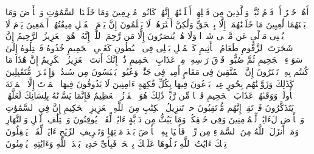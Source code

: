\startbuffer[\q:44:37]
أَهُمۡ خَیۡرٌ أَمۡ قَوۡمُ تُبَّعࣲ وَٱلَّذِینَ مِن قَبۡلِهِمۡ أَهۡلَكۡنَٰهُمۡۚ إِنَّهُمۡ كَانُوا۟ مُجۡرِمِینَ%
\stopbuffer
\startbuffer[\q:44:38]
وَمَا خَلَقۡنَا ٱلسَّمَٰوَٰتِ وَٱلۡأَرۡضَ وَمَا بَیۡنَهُمَا لَٰعِبِینَ%
\stopbuffer
\startbuffer[\q:44:39]
مَا خَلَقۡنَٰهُمَاۤ إِلَّا بِٱلۡحَقِّ وَلَٰكِنَّ أَكۡثَرَهُمۡ لَا یَعۡلَمُونَ%
\stopbuffer
\startbuffer[\q:44:40]
إِنَّ یَوۡمَ ٱلۡفَصۡلِ مِیقَٰتُهُمۡ أَجۡمَعِینَ%
\stopbuffer
\startbuffer[\q:44:41]
یَوۡمَ لَا یُغۡنِی مَوۡلًى عَن مَّوۡلࣰى شَیۡءࣰا وَلَا هُمۡ یُنصَرُونَ%
\stopbuffer
\startbuffer[\q:44:42]
إِلَّا مَن رَّحِمَ ٱللَّهُۚ إِنَّهُۥ هُوَ ٱلۡعَزِیزُ ٱلرَّحِیمُ%
\stopbuffer
\startbuffer[\q:44:43]
إِنَّ شَجَرَتَ ٱلزَّقُّومِ%
\stopbuffer
\startbuffer[\q:44:44]
طَعَامُ ٱلۡأَثِیمِ%
\stopbuffer
\startbuffer[\q:44:45]
كَٱلۡمُهۡلِ یَغۡلِی فِی ٱلۡبُطُونِ%
\stopbuffer
\startbuffer[\q:44:46]
كَغَلۡیِ ٱلۡحَمِیمِ%
\stopbuffer
\startbuffer[\q:44:47]
خُذُوهُ فَٱعۡتِلُوهُ إِلَىٰ سَوَاۤءِ ٱلۡجَحِیمِ%
\stopbuffer
\startbuffer[\q:44:48]
ثُمَّ صُبُّوا۟ فَوۡقَ رَأۡسِهِۦ مِنۡ عَذَابِ ٱلۡحَمِیمِ%
\stopbuffer
\startbuffer[\q:44:49]
ذُقۡ إِنَّكَ أَنتَ ٱلۡعَزِیزُ ٱلۡكَرِیمُ%
\stopbuffer
\startbuffer[\q:44:50]
إِنَّ هَٰذَا مَا كُنتُم بِهِۦ تَمۡتَرُونَ%
\stopbuffer
\startbuffer[\q:44:51]
إِنَّ ٱلۡمُتَّقِینَ فِی مَقَامٍ أَمِینࣲ%
\stopbuffer
\startbuffer[\q:44:52]
فِی جَنَّٰتࣲ وَعُیُونࣲ%
\stopbuffer
\startbuffer[\q:44:53]
یَلۡبَسُونَ مِن سُندُسࣲ وَإِسۡتَبۡرَقࣲ مُّتَقَٰبِلِینَ%
\stopbuffer
\startbuffer[\q:44:54]
كَذَٰلِكَ وَزَوَّجۡنَٰهُم بِحُورٍ عِینࣲ%
\stopbuffer
\startbuffer[\q:44:55]
یَدۡعُونَ فِیهَا بِكُلِّ فَٰكِهَةٍ ءَامِنِینَ%
\stopbuffer
\startbuffer[\q:44:56]
لَا یَذُوقُونَ فِیهَا ٱلۡمَوۡتَ إِلَّا ٱلۡمَوۡتَةَ ٱلۡأُولَىٰۖ وَوَقَىٰهُمۡ عَذَابَ ٱلۡجَحِیمِ%
\stopbuffer
\startbuffer[\q:44:57]
فَضۡلࣰا مِّن رَّبِّكَۚ ذَٰلِكَ هُوَ ٱلۡفَوۡزُ ٱلۡعَظِیمُ%
\stopbuffer
\startbuffer[\q:44:58]
فَإِنَّمَا یَسَّرۡنَٰهُ بِلِسَانِكَ لَعَلَّهُمۡ یَتَذَكَّرُونَ%
\stopbuffer
\startbuffer[\q:44:59]
فَٱرۡتَقِبۡ إِنَّهُم مُّرۡتَقِبُونَ%
\stopbuffer
\startbuffer[\q:45:1]
حمۤ%
\stopbuffer
\startbuffer[\q:45:2]
تَنزِیلُ ٱلۡكِتَٰبِ مِنَ ٱللَّهِ ٱلۡعَزِیزِ ٱلۡحَكِیمِ%
\stopbuffer
\startbuffer[\q:45:3]
إِنَّ فِی ٱلسَّمَٰوَٰتِ وَٱلۡأَرۡضِ لَءَایَٰتࣲ لِّلۡمُؤۡمِنِینَ%
\stopbuffer
\startbuffer[\q:45:4]
وَفِی خَلۡقِكُمۡ وَمَا یَبُثُّ مِن دَاۤبَّةٍ ءَایَٰتࣱ لِّقَوۡمࣲ یُوقِنُونَ%
\stopbuffer
\startbuffer[\q:45:5]
وَٱخۡتِلَٰفِ ٱلَّیۡلِ وَٱلنَّهَارِ وَمَاۤ أَنزَلَ ٱللَّهُ مِنَ ٱلسَّمَاۤءِ مِن رِّزۡقࣲ فَأَحۡیَا بِهِ ٱلۡأَرۡضَ بَعۡدَ مَوۡتِهَا وَتَصۡرِیفِ ٱلرِّیَٰحِ ءَایَٰتࣱ لِّقَوۡمࣲ یَعۡقِلُونَ%
\stopbuffer
\startbuffer[\q:45:6]
تِلۡكَ ءَایَٰتُ ٱللَّهِ نَتۡلُوهَا عَلَیۡكَ بِٱلۡحَقِّۖ فَبِأَیِّ حَدِیثِۭ بَعۡدَ ٱللَّهِ وَءَایَٰتِهِۦ یُؤۡمِنُونَ%
